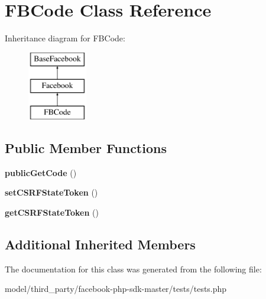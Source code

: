\hypertarget{classFBCode}{\section{F\-B\-Code Class Reference}
\label{classFBCode}
}
Inheritance diagram for F\-B\-Code\-:\begin{figure}[H]
\begin{center}
\leavevmode
\includegraphics[height=3.000000cm]{classFBCode}
\end{center}
\end{figure}
\subsection*{Public Member Functions}
\begin{DoxyCompactItemize}
\item 
\hypertarget{classFBCode_abf2c4dc2ed7e822d9b23cd43267b573f}{{\bfseries public\-Get\-Code} ()}\label{classFBCode_abf2c4dc2ed7e822d9b23cd43267b573f}

\item 
\hypertarget{classFBCode_a39918078429d9ea2ee73956b41630fa6}{{\bfseries set\-C\-S\-R\-F\-State\-Token} ()}\label{classFBCode_a39918078429d9ea2ee73956b41630fa6}

\item 
\hypertarget{classFBCode_ac1acc2e33d6be7a16d841213bfe6e69a}{{\bfseries get\-C\-S\-R\-F\-State\-Token} ()}\label{classFBCode_ac1acc2e33d6be7a16d841213bfe6e69a}

\end{DoxyCompactItemize}
\subsection*{Additional Inherited Members}


The documentation for this class was generated from the following file\-:\begin{DoxyCompactItemize}
\item 
model/third\-\_\-party/facebook-\/php-\/sdk-\/master/tests/tests.\-php\end{DoxyCompactItemize}
